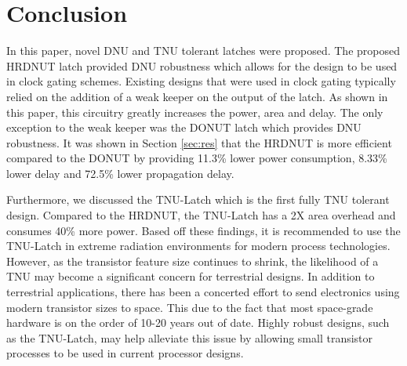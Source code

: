 \section{Conclusion} \label{sec:conc}
In this paper, novel DNU and TNU tolerant latches were proposed. The proposed HRDNUT latch provided DNU robustness which allows for the design to be used in clock gating schemes. Existing designs that were used in clock gating typically relied on the addition of a weak keeper on the output of the latch. As shown in this paper, this circuitry greatly increases the power, area and delay. The only exception to the weak keeper was the DONUT latch which provides DNU robustness. It was shown in Section \ref{sec:res} that the HRDNUT is more efficient compared to the DONUT by providing 11.3\% lower power consumption, 8.33\% lower delay and 72.5\% lower propagation delay. 

Furthermore, we discussed the TNU-Latch which is the first fully TNU tolerant design. Compared to the HRDNUT, the TNU-Latch has a 2X area overhead and consumes 40\% more power. Based off these findings, it is recommended to use the TNU-Latch in extreme radiation environments for modern process technologies. However, as the transistor feature size continues to shrink, the likelihood of a TNU may become a significant concern for terrestrial designs. In addition to terrestrial applications, there has been a concerted effort to send electronics using modern transistor sizes to space. This due to the fact that most space-grade hardware is on the order of 10-20 years out of date. Highly robust designs, such as the TNU-Latch, may help alleviate this issue by allowing small transistor processes to be used in current processor designs.